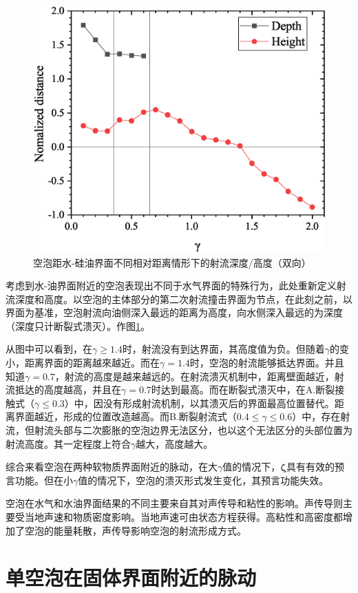 \begin{figure}[h]
    \centering
    \includegraphics[width=0.6\linewidth]{img/fig3.oildistance.eps}
    \caption{空泡距水-硅油界面不同相对距离情形下的射流深度/高度（双向）}
    \label{fig3.oildistance}
\end{figure}

考虑到水-油界面附近的空泡表现出不同于水气界面的特殊行为，此处重新定义射流深度和高度。以空泡的主体部分的第二次射流撞击界面为节点，在此刻之前，以界面为基准，空泡射流向油侧深入最远的距离为高度，向水侧深入最远的为深度（深度只计断裂式溃灭）。作图\ref{fig3.oildistance}。

从图中可以看到，在$\gamma\geq1.4$时，射流没有到达界面，其高度值为负。但随着$\gamma$的变小，距离界面的距离越來越近。而在$\gamma=1.4$时，空泡的射流能够抵达界面。并且知道$\gamma=0.7$，射流的高度是越来越远的。在射流溃灭机制中，距离壁面越近，射流抵达的高度越高，并且在$\gamma=0.7$时达到最高。而在断裂式溃灭中，在A.断裂接触式（$\gamma\leq 0.3$）中，因没有形成射流机制，以其溃灭后的界面最高位置替代。距离界面越近，形成的位置改造越高。而B.断裂射流式（$0.4\leq\gamma\leq 0.6$）中，存在射流，但射流头部与二次膨胀的空泡边界无法区分，也以这个无法区分的头部位置为射流高度。其一定程度上符合$\gamma$越大，高度越大。




综合来看空泡在两种软物质界面附近的脉动，在大$\gamma$值的情况下，$\mathbf{\zeta}$具有有效的预言功能。但在小$\gamma$值的情况下，空泡的溃灭形式发生变化，其预言功能失效。

空泡在水气和水油界面结果的不同主要来自其对声传导和粘性的影响。声传导则主要受当地声速和物质密度影响。当地声速可由状态方程获得。高粘性和高密度都增加了空泡的能量耗散，声传导影响空泡的射流形成方式。

\section{单空泡在固体界面附近的脉动}

